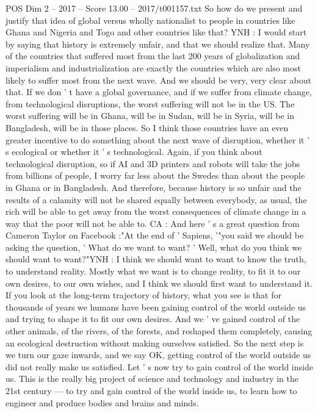 \begin{textsample}{POS Dim 2 – 2017 – Score 13.00 – 2017/t001157.txt}
So how do we present and justify that idea of global versus wholly nationalist to people in countries like Ghana and Nigeria and Togo and other countries like that?
YNH : I would start by saying that history is extremely unfair, and that we should realize that.
Many of the countries that suffered most from the last 200 years of globalization and imperialism and industrialization are exactly the countries which are also most likely to suffer most from the next wave.
And we should be very, very clear about that.
If we don ' t have a global governance, and if we suffer from climate change, from technological disruptions, the worst suffering will not be in the US.
The worst suffering will be in Ghana, will be in Sudan, will be in Syria, will be in Bangladesh, will be in those places.
So I think those countries have an even greater incentive to do something about the next wave of disruption, whether it ' s ecological or whether it ' s technological.
Again, if you think about technological disruption, so if AI and 3D printers and robots will take the jobs from billions of people, I worry far less about the Swedes than about the people in Ghana or in Bangladesh.
And therefore, because history is so unfair and the results of a calamity will not be shared equally between everybody, as usual, the rich will be able to get away from the worst consequences of climate change in a way that the poor will not be able to.
CA : And here ' s a great question from Cameron Taylor on Facebook :"At the end of ' Sapiens, '"you said we should be asking the question, ' What do we want to want? ' Well, what do you think we should want to want?"YNH : I think we should want to want to know the truth, to understand reality.
Mostly what we want is to change reality, to fit it to our own desires, to our own wishes, and I think we should first want to understand it.
If you look at the long-term trajectory of history, what you see is that for thousands of years we humans have been gaining control of the world outside us and trying to shape it to fit our own desires.
And we ' ve gained control of the other animals, of the rivers, of the forests, and reshaped them completely, causing an ecological destruction without making ourselves satisfied.
So the next step is we turn our gaze inwards, and we say OK, getting control of the world outside us did not really make us satisfied.
Let ' s now try to gain control of the world inside us.
This is the really big project of science and technology and industry in the 21st century — to try and gain control of the world inside us, to learn how to engineer and produce bodies and brains and minds.

\end{textsample}
